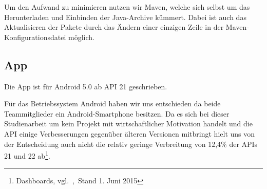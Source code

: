Um den Aufwand zu minimieren nutzen wir Maven, welche sich selbst um das Herunterladen und Einbinden der Java-Archive kümmert. Dabei ist auch das Aktualisieren der Pakete durch das Ändern einer einzigen Zeile in der Maven-Konfigurationsdatei möglich.
\subsection{App}
Die App ist für Android 5.0 ab API 21 geschrieben. 

Für das Betriebssystem Android haben wir uns entschieden da beide Teammitglieder ein Android-Smartphone besitzen. Da es sich bei dieser Studienarbeit um kein Projekt mit wirtschaftlicher Motivation handelt und die API einige Verbesserungen gegenüber älteren Versionen mitbringt hielt uns von der Entscheidung auch nicht die relativ geringe Verbreitung von 12,4\% der APIs 21 und 22 ab\footnote{Dashboards, vgl.~\cite{verbreitung},~Stand 1. Juni 2015}.